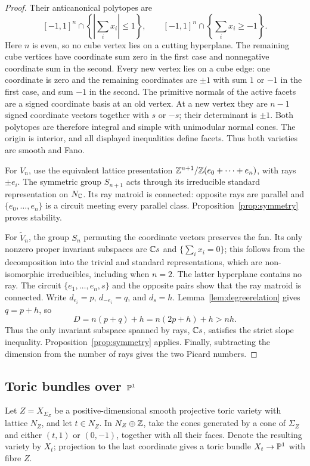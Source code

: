 \begin{proof}
Their anticanonical polytopes are
\[
 [-1,1]^n\cap\left\{\left|\sum_i x_i\right|\le1\right\},
 \qquad
 [-1,1]^n\cap\left\{\sum_i x_i\ge-1\right\}.
\]
Here $n$ is even, so no cube vertex lies on a cutting hyperplane.
The remaining cube vertices have coordinate sum zero in the first
case and nonnegative coordinate sum in the second. Every new vertex
lies on a cube edge: one coordinate is zero and the remaining
coordinates are $\pm1$ with sum $1$ or $-1$ in the first case, and
sum $-1$ in the second. The primitive normals of the active facets
are a signed coordinate basis at an old vertex. At a new vertex they
are $n-1$ signed coordinate vectors together with $s$ or $-s$; their
determinant is $\pm1$. Both polytopes are therefore integral and
simple with unimodular normal cones. The origin is interior, and
all displayed inequalities define facets. Thus both varieties are smooth
and Fano.

For $V_n$, use the equivalent lattice presentation
$\mathbb{Z}^{n+1}/\mathbb{Z}(e_0+\cdots+e_n)$, with rays $\pm e_i$.
The symmetric group $S_{n+1}$ acts through its irreducible standard
representation on $N_{\mathbb{C}}$. Its ray matroid is connected: opposite
rays are parallel and $\{e_0,\ldots,e_n\}$ is a circuit meeting
every parallel class. Proposition~\ref{prop:symmetry} proves stability.

For $\widetilde V_n$, the group $S_n$ permuting the coordinate
vectors preserves the fan. Its only nonzero proper invariant
subspaces are $\mathbb{C} s$ and $\{\sum_i x_i=0\}$; this follows from the
decomposition into the trivial and standard representations,
which are non-isomorphic irreducibles, including when $n=2$.
The latter hyperplane contains no ray. The circuit
$\{e_1,\ldots,e_n,s\}$ and the opposite pairs show that the ray
matroid is connected. Write $d_{e_i}=p$, $d_{-e_i}=q$, and $d_s=h$.
Lemma~\ref{lem:degreerelation} gives $q=p+h$, so
\[
 D=n(p+q)+h=n(2p+h)+h>nh.
\]
Thus the only invariant subspace spanned by rays, $\mathbb{C} s$, satisfies
the strict slope inequality. Proposition~\ref{prop:symmetry} applies.
Finally, subtracting the dimension from the number of rays gives
the two Picard numbers.
\end{proof}

\subsection{Toric bundles over \texorpdfstring{$\mathbb{P}^1$}{P1}}

Let $Z=X_{\Sigma_Z}$ be a positive-dimensional smooth projective toric variety with lattice
$N_Z$, and let $t\in N_Z$. In $N_Z\oplus\mathbb{Z}$, take the cones
generated by a cone of $\Sigma_Z$ and either $(t,1)$ or $(0,-1)$,
together with all their faces. Denote the resulting variety by $X_t$;
projection to the last coordinate gives a toric bundle
$X_t\to\mathbb{P}^1$ with fibre $Z$.


